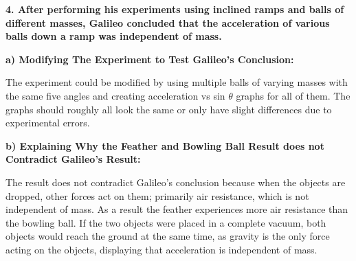\documentclass[12pt,letterpaper]{article}
\newcommand\tab[1][1cm]{\hspace*{#1}}
\begin{document}
\vspace{8mm}
\noindent
\textbf{4. After performing his experiments using inclined ramps and balls of different masses, Galileo concluded that the acceleration of various balls down a ramp was independent of mass.}

\noindent
\tab \textbf{a) Modifying The Experiment to Test Galileo's Conclusion:}

\noindent
\tab The experiment could be modified by using multiple balls of varying masses with the \tab same five angles and creating acceleration vs sin $\theta$ graphs for all of them. The graphs \tab should roughly all look the same or only have slight differences due to experimental \tab errors.

\noindent
\tab \textbf{b) Explaining Why the Feather and Bowling Ball Result does not Contradict \tab Galileo's Result:}

\noindent
\tab The result does not contradict Galileo’s conclusion because when the objects are \tab dropped, other forces act on them; primarily air resistance, which is not independent \tab of mass. As a result the feather experiences more air resistance than the bowling ball. \tab If the two objects were placed in a complete vacuum, both objects would reach the \tab ground at the same time, as gravity is the only force acting on the objects, displaying \tab that acceleration is independent of mass.
\end{document}

